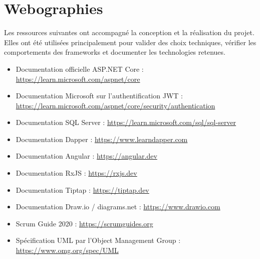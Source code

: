 \chapter*{Webographies}

Les ressources suivantes ont accompagné la conception et la réalisation du projet. Elles ont été utilisées principalement pour valider des choix techniques, vérifier les comportements des frameworks et documenter les technologies retenues.

\begin{itemize}
    \item Documentation officielle ASP.NET Core : \url{https://learn.microsoft.com/aspnet/core}
    \item Documentation Microsoft sur l'authentification JWT : \url{https://learn.microsoft.com/aspnet/core/security/authentication}
    \item Documentation SQL Server : \url{https://learn.microsoft.com/sql/sql-server}
    \item Documentation Dapper : \url{https://www.learndapper.com}
    \item Documentation Angular : \url{https://angular.dev}
    \item Documentation RxJS : \url{https://rxjs.dev}
    \item Documentation Tiptap : \url{https://tiptap.dev}
    \item Documentation Draw.io / diagrams.net : \url{https://www.drawio.com}
    \item Scrum Guide 2020 : \url{https://scrumguides.org}
    \item Spécification UML par l'Object Management Group : \url{https://www.omg.org/spec/UML}
\end{itemize}
